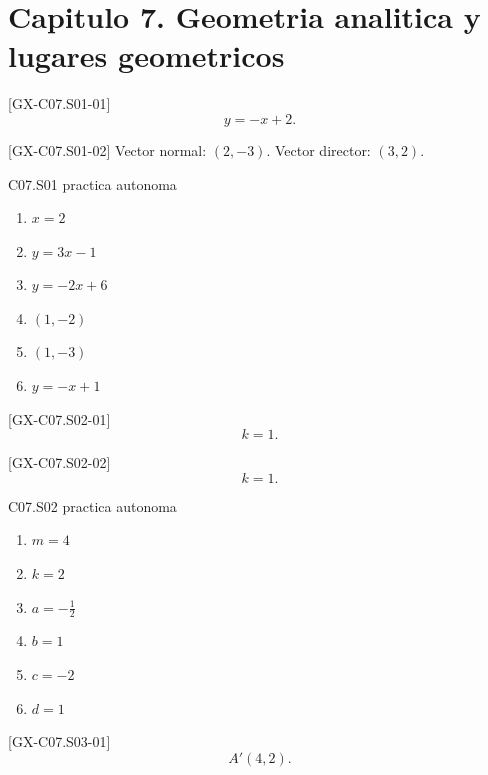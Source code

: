 \section*{Capitulo 7. Geometria analitica y lugares geometricos}

\begin{shortanswer}{[GX-C07.S01-01]}
\[
y=-x+2.
\]
\end{shortanswer}

\begin{shortanswer}{[GX-C07.S01-02]}
Vector normal: \((2,-3)\). Vector director: \((3,2)\).
\end{shortanswer}

\begin{shortanswer}{C07.S01 practica autonoma}
\begin{enumerate}[label=\textbf{PX-C07.S01-\arabic*:}, leftmargin=*]
  \item \(x=2\)
  \item \(y=3x-1\)
  \item \(y=-2x+6\)
  \item \((1,-2)\)
  \item \((1,-3)\)
  \item \(y=-x+1\)
\end{enumerate}
\end{shortanswer}

\begin{shortanswer}{[GX-C07.S02-01]}
\[
k=1.
\]
\end{shortanswer}

\begin{shortanswer}{[GX-C07.S02-02]}
\[
k=1.
\]
\end{shortanswer}

\begin{shortanswer}{C07.S02 practica autonoma}
\begin{enumerate}[label=\textbf{PX-C07.S02-\arabic*:}, leftmargin=*]
  \item \(m=4\)
  \item \(k=2\)
  \item \(a=-\frac{1}{2}\)
  \item \(b=1\)
  \item \(c=-2\)
  \item \(d=1\)
\end{enumerate}
\end{shortanswer}

\begin{shortanswer}{[GX-C07.S03-01]}
\[
A'(4,2).
\]
\end{shortanswer}

